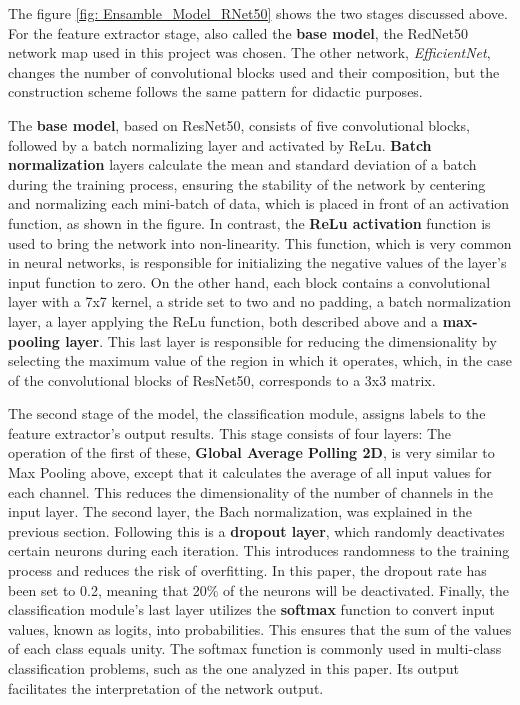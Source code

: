 The figure \ref{fig: Ensamble_Model_RNet50} shows the two stages discussed above. For the feature extractor stage, also called the \textbf{base model}, the RedNet50 network map used in this project was chosen. The other network, \textit{EfficientNet}, changes the number of convolutional blocks used and their composition, but the construction scheme follows the same pattern for didactic purposes. 

The \textbf{base model}, based on ResNet50, consists of five convolutional blocks, followed by a batch normalizing layer and activated by ReLu. \textbf{Batch normalization} layers calculate the mean and standard deviation of a batch during the training process, ensuring the stability of the network by centering and normalizing each mini-batch of data, which is placed in front of an activation function, as shown in the figure. In contrast, the \textbf{ReLu activation} function is used to bring the network into non-linearity. This function, which is very common in neural networks, is responsible for initializing the negative values of the layer's input function to zero. On the other hand, each block contains a convolutional layer with a 7x7 kernel, a stride set to two and no padding, a batch normalization layer, a layer applying the ReLu function, both described above and a \textbf{max-pooling layer}. This last layer is responsible for reducing the dimensionality by selecting the maximum value of the region in which it operates, which, in the case of the convolutional blocks of ResNet50, corresponds to a 3x3 matrix.

The second stage of the model, the classification module, assigns labels to the feature extractor's output results. This stage consists of four layers: The operation of the first of these, \textbf{Global Average Polling 2D}, is very similar to Max Pooling above, except that it calculates the average of all input values for each channel. This reduces the dimensionality of the number of channels in the input layer. The second layer, the Bach normalization, was explained in the previous section. Following this is a \textbf{dropout layer}, which randomly deactivates certain neurons during each iteration. This introduces randomness to the training process and reduces the risk of overfitting. In this paper, the dropout rate has been set to 0.2, meaning that 20\% of the neurons will be deactivated. Finally, the classification module's last layer utilizes the \textbf{softmax} function to convert input values, known as logits, into probabilities. This ensures that the sum of the values of each class equals unity. The softmax function is commonly used in multi-class classification problems, such as the one analyzed in this paper. Its output facilitates the interpretation of the network output.

